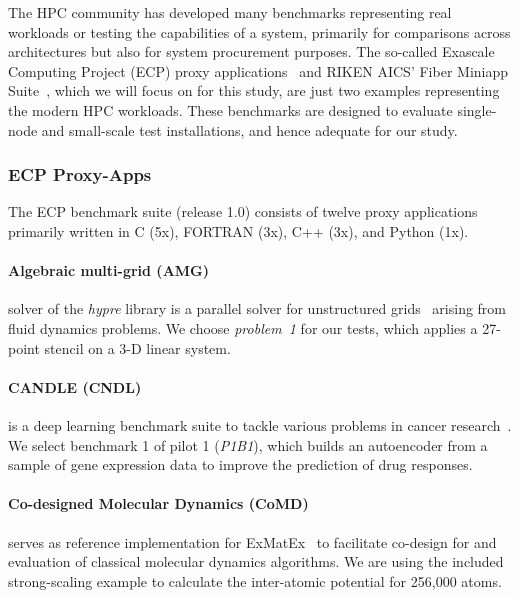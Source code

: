 The HPC community has developed many benchmarks representing real workloads or testing the
capabilities of a system, primarily for comparisons across architectures but also for system
procurement purposes.
The so-called Exascale Computing Project (ECP) proxy applications~\cite{noauthor_ecp_2018} and
RIKEN AICS' Fiber Miniapp Suite~\cite{riken_aics_fiber_2015}, which we will focus on for this study, are just
two examples representing the modern HPC workloads.
These benchmarks are designed to evaluate single-node and small-scale test installations,
and hence adequate for our study.


\subsubsection{ECP Proxy-Apps}\label{ssec:ecp}
The ECP benchmark suite (release 1.0) consists of twelve proxy applications primarily written in C (5x),
FORTRAN (3x), C++ (3x), and Python (1x).

\paragraph{Algebraic multi-grid (AMG)} solver of the \textit{hypre} library is a parallel solver
for unstructured grids~\cite{park_high-performance_2015} arising from fluid dynamics problems.
We choose \textit{problem~1} for our tests, which applies a 27-point stencil on a 3-D linear system.

\paragraph{CANDLE (CNDL)} is a deep learning benchmark suite to tackle various problems in cancer
research~\cite{wozniak_candle/supervisor:_2018}.
We select benchmark 1 of pilot 1 (\textit{P1B1}), which builds an autoencoder from a sample of gene
expression data to improve the prediction of drug responses.

\paragraph{Co-designed Molecular Dynamics (CoMD)} serves as reference implementation for
ExMatEx~\cite{mohd-yusof_co-design_2013} to facilitate co-design for and evaluation of classical molecular
dynamics algorithms.
We are using the included strong-scaling example to calculate the inter-atomic potential for 256,000 atoms.

